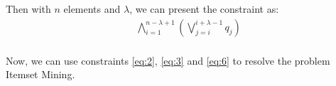 Then with $n$ elements and $\lambda$, we can present the constraint as:
\begin{equation}
    \label{eq:6}
    \begin{aligned}
         & \bigwedge_{i=1}^{n-\lambda+1} \left( \bigvee_{j=i}^{i+\lambda-1} q_j \right) \\
    \end{aligned}
\end{equation}

Now, we can use constraints \ref{eq:2}, \ref{eq:3} and \ref{eq:6} to resolve the problem Itemset Mining.